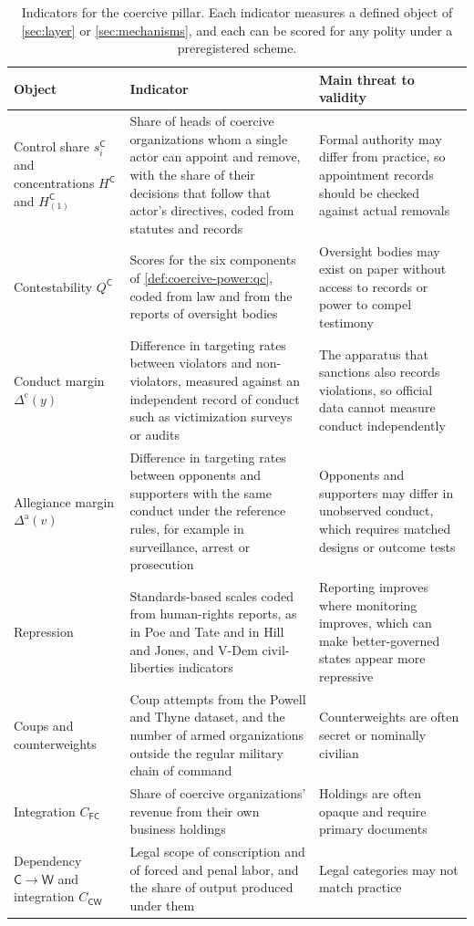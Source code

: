 \documentclass[11pt,letterpaper]{article}
\theoremstyle{definition}
\theoremstyle{remark}
\newcommand{\pF}{\mathsf{F}}
\newcommand{\pC}{\mathsf{C}}
\newcommand{\pW}{\mathsf{W}}
\begin{document}
\begin{table}[!htbp]
\centering
\small
\caption{Indicators for the coercive pillar. Each indicator measures a defined object of \cref{sec:layer} or \cref{sec:mechanisms}, and each can be scored for any polity under a preregistered scheme.}
\label{tab:indicators}
\renewcommand{\arraystretch}{1.15}
\begin{tabularx}{\textwidth}{@{}L{3.0cm}YY@{}}
\toprule
Object & Indicator & Main threat to validity \\
\midrule
Control share $s^{\pC}_i$ and concentrations $H^{\pC}$ and $H^{\pC}_{(1)}$ & Share of heads of coercive organizations whom a single actor can appoint and remove, with the share of their decisions that follow that actor's directives, coded from statutes and records & Formal authority may differ from practice, so appointment records should be checked against actual removals \\
Contestability $Q^{\pC}$ & Scores for the six components of \cref{def:coercive-power:qc}, coded from law and from the reports of oversight bodies & Oversight bodies may exist on paper without access to records or power to compel testimony \\
Conduct margin $\Delta^{\mathrm{c}}(y)$ & Difference in targeting rates between violators and non-violators, measured against an independent record of conduct such as victimization surveys or audits & The apparatus that sanctions also records violations, so official data cannot measure conduct independently \\
Allegiance margin $\Delta^{\mathrm{a}}(v)$ & Difference in targeting rates between opponents and supporters with the same conduct under the reference rules, for example in surveillance, arrest or prosecution & Opponents and supporters may differ in unobserved conduct, which requires matched designs or outcome tests \\
Repression & Standards-based scales coded from human-rights reports, as in Poe and Tate and in Hill and Jones, and V-Dem civil-liberties indicators & Reporting improves where monitoring improves, which can make better-governed states appear more repressive \\
Coups and counterweights & Coup attempts from the Powell and Thyne dataset, and the number of armed organizations outside the regular military chain of command & Counterweights are often secret or nominally civilian \\
Integration $C_{\pF\pC}$ & Share of coercive organizations' revenue from their own business holdings & Holdings are often opaque and require primary documents \\
Dependency $\pC \to \pW$ and integration $C_{\pC\pW}$ & Legal scope of conscription and of forced and penal labor, and the share of output produced under them & Legal categories may not match practice \\
\bottomrule
\end{tabularx}
\end{table}
\end{document}
